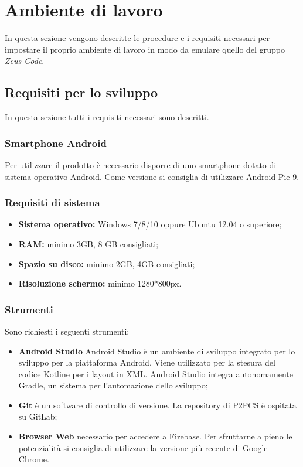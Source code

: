 \section{Ambiente di lavoro}
In questa sezione vengono descritte le procedure e i requisiti necessari per impostare il proprio ambiente di lavoro in modo da emulare quello del gruppo \textit{Zeus Code}.  
\subsection{Requisiti per lo sviluppo}
In questa sezione tutti i requisiti necessari sono descritti.
\subsubsection{Smartphone Android}
Per utilizzare il prodotto è necessario disporre di uno smartphone dotato di sistema operativo Android. Come versione si consiglia di utilizzare Android Pie 9.
\subsubsection{Requisiti di sistema}
\begin{itemize}
	\item \textbf{Sistema operativo:} Windows 7/8/10 oppure Ubuntu 12.04 o superiore;
	\item \textbf{RAM:} minimo 3GB, 8 GB consigliati;
	\item \textbf{Spazio su disco:} minimo 2GB, 4GB consigliati;
	\item \textbf{Risoluzione schermo:} minimo 1280*800px.
\end{itemize}
\subsubsection{Strumenti}
Sono richiesti i seguenti strumenti:
\begin{itemize}
	\item \textbf{Android Studio} Android Studio è un ambiente di sviluppo integrato per lo sviluppo per la piattaforma Android\glosp. Viene utilizzato per la stesura del codice Kotlin\glosp e per i layout in XML\glosp. Android Studio integra autonomamente Gradle, un sistema per l'automazione dello sviluppo;
	\item \textbf{Git} è un software di controllo di versione. La repository di P2PCS è ospitata su GitLab;
	\item \textbf{Browser Web} necessario per accedere a Firebase. Per sfruttarne a pieno le potenzialità si consiglia di utilizzare la versione più recente di Google Chrome.
\end{itemize}
